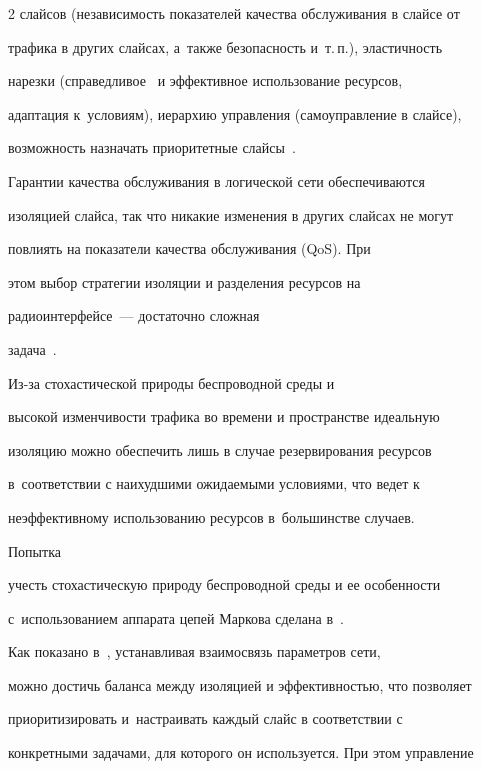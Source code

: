 \begin{multicols}{2}
слайсов (независимость показателей качества обслуживания в слайсе от 


трафика в других слайсах, а~также безопас\-ность и~т.\,п.), эластичность 


нарезки (справедливое~\cite{4-mos} и эффективное использование ресурсов, 


адаптация к~условиям), иерархию управ\-ления (самоуправление в слайсе), 


возможность назначать приоритетные слайсы~\cite{3-mos}.


  


  Гарантии качества обслуживания в логической сети обеспечиваются 


изоляцией слайса, так что никакие изменения в других слайсах не могут 


повлиять на показатели качества обслуживания (QoS). При 


этом выбор стратегии изоляции и разделения ресурсов на 


радиоинтерфейсе~--- достаточно сложная  


задача~\cite{5-mos}. 





Из-за стохастической природы беспроводной среды и 


высокой изменчивости трафика во времени и пространстве идеальную 


изоляцию можно обеспечить лишь в случае резервирования ресурсов 


в~соответствии с наихудшими ожидаемыми условиями, что ведет к 


неэффективному использованию ресурсов в~большинстве случаев. 


Попытка 


учесть стохастическую природу беспроводной среды и ее особенности 


с~использованием аппарата цепей Маркова сделана в~\cite{6-mos}. 





Как показано в~\cite{7-mos}, устанавливая взаимосвязь параметров сети, 


можно достичь баланса между изоляцией и эф\-фек\-тив\-ностью, что позволяет 


прио\-ри\-тизировать и~настраивать каждый слайс в со\-от\-вет\-ствии с 


конкретными задачами, для которого он используется. При этом управ\-ле\-ние 



\end{multicols}
